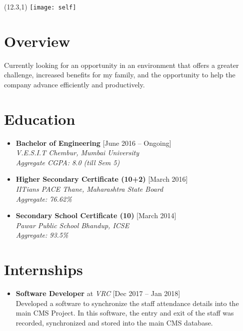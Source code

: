 \documentclass[11pt,a4paper]{moderncv}
\begin{document}
\hskip-2.5cm\makecvtitle
\begin{textblock}{0}(12.3,1)
\texttt{[image: self]}
\end{textblock}

\section{Overview}
Currently looking for an opportunity in an environment that offers a greater challenge, increased benefits for my family, and the opportunity to help the company advance efficiently and productively.

\section{Education}

\begin{itemize}

\item \textbf{Bachelor of Engineering} \hfill [June 2016 -- Ongoing]\\
\textit{V.E.S.I.T Chembur, Mumbai University\\ 
Aggregate CGPA: 8.0 (till Sem 5)\\}

\item \textbf{Higher Secondary Certificate (10+2)} \hfill [March 2016]\\
\textit{IITians PACE Thane, Maharashtra State Board \\ 
Aggregate: 76.62\%}

\item \textbf{Secondary School Certificate (10)} \hfill [March 2014]\\
\textit{Pawar Public School Bhandup, ICSE\\ 
Aggregate: 93.5\%}

\end{itemize}

\section{Internships}

\begin{itemize}
	
	\item \textbf{Software Developer} at \textit{VRC} \hfill [Dec 2017 -- Jan 2018]\\
     Developed a software to synchronize the staff attendance details into the main CMS 		 Project. In this software, the entry and exit of the staff was recorded,	synchronized and stored into the main CMS database.
\end{itemize}
\end{document}
